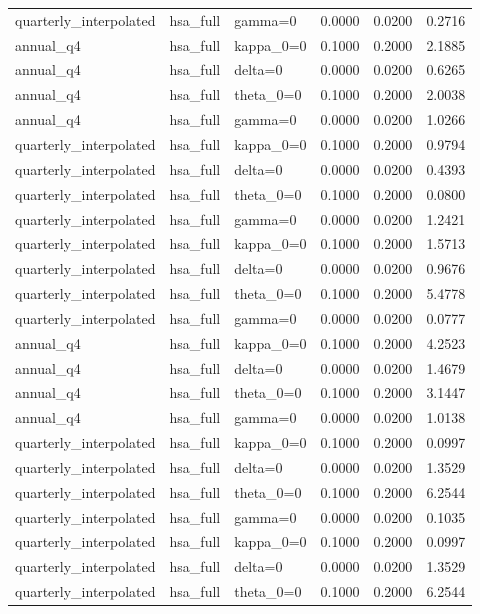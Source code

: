 \begin{tabular}{lllrrr}
quarterly\_interpolated & hsa\_full & gamma=0 & 0.0000 & 0.0200 & 0.2716 \\
annual\_q4 & hsa\_full & kappa\_0=0 & 0.1000 & 0.2000 & 2.1885 \\
annual\_q4 & hsa\_full & delta=0 & 0.0000 & 0.0200 & 0.6265 \\
annual\_q4 & hsa\_full & theta\_0=0 & 0.1000 & 0.2000 & 2.0038 \\
annual\_q4 & hsa\_full & gamma=0 & 0.0000 & 0.0200 & 1.0266 \\
quarterly\_interpolated & hsa\_full & kappa\_0=0 & 0.1000 & 0.2000 & 0.9794 \\
quarterly\_interpolated & hsa\_full & delta=0 & 0.0000 & 0.0200 & 0.4393 \\
quarterly\_interpolated & hsa\_full & theta\_0=0 & 0.1000 & 0.2000 & 0.0800 \\
quarterly\_interpolated & hsa\_full & gamma=0 & 0.0000 & 0.0200 & 1.2421 \\
quarterly\_interpolated & hsa\_full & kappa\_0=0 & 0.1000 & 0.2000 & 1.5713 \\
quarterly\_interpolated & hsa\_full & delta=0 & 0.0000 & 0.0200 & 0.9676 \\
quarterly\_interpolated & hsa\_full & theta\_0=0 & 0.1000 & 0.2000 & 5.4778 \\
quarterly\_interpolated & hsa\_full & gamma=0 & 0.0000 & 0.0200 & 0.0777 \\
annual\_q4 & hsa\_full & kappa\_0=0 & 0.1000 & 0.2000 & 4.2523 \\
annual\_q4 & hsa\_full & delta=0 & 0.0000 & 0.0200 & 1.4679 \\
annual\_q4 & hsa\_full & theta\_0=0 & 0.1000 & 0.2000 & 3.1447 \\
annual\_q4 & hsa\_full & gamma=0 & 0.0000 & 0.0200 & 1.0138 \\
quarterly\_interpolated & hsa\_full & kappa\_0=0 & 0.1000 & 0.2000 & 0.0997 \\
quarterly\_interpolated & hsa\_full & delta=0 & 0.0000 & 0.0200 & 1.3529 \\
quarterly\_interpolated & hsa\_full & theta\_0=0 & 0.1000 & 0.2000 & 6.2544 \\
quarterly\_interpolated & hsa\_full & gamma=0 & 0.0000 & 0.0200 & 0.1035 \\
quarterly\_interpolated & hsa\_full & kappa\_0=0 & 0.1000 & 0.2000 & 0.0997 \\
quarterly\_interpolated & hsa\_full & delta=0 & 0.0000 & 0.0200 & 1.3529 \\
quarterly\_interpolated & hsa\_full & theta\_0=0 & 0.1000 & 0.2000 & 6.2544 \\

\end{tabular}
